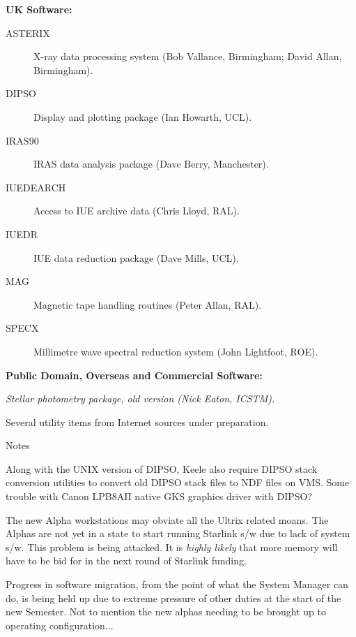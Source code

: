 \begin{center}
{\bf UK Software:}
\end{center}

\begin{description}
\item[ASTERIX] X-ray data processing system (Bob Vallance, Birmingham; 
David Allan, Birmingham).
\item[DIPSO] Display and plotting package (Ian Howarth, UCL).
\item[IRAS90] IRAS data analysis package (Dave Berry, Manchester).
\item[IUEDEARCH] Access to IUE archive data (Chris Lloyd, RAL).
\item[IUEDR] IUE data reduction package (Dave Mills, UCL).
\item[MAG] Magnetic tape handling routines (Peter Allan, RAL).
\item[SPECX] Millimetre wave spectral reduction system (John Lightfoot, ROE).
\end{description}


\newpage
\vspace{5mm}
\begin{center}
{\bf Public Domain, Overseas and Commercial Software:}
\end{center}

\begin{description}
\item[{\em DAOPHOT}] {\em Stellar photometry package, old version (Nick 
Eaton, ICSTM).}
\item  Several utility items from Internet sources under preparation.
\end{description}


\vspace{5mm}
\begin{center}
{\large\sc Notes}
\end{center}

Along with the UNIX version of DIPSO, Keele also require DIPSO stack conversion
utilities to convert old DIPSO stack files to NDF files on VMS.
Some trouble with Canon LPB8AII native GKS graphics driver with DIPSO?

The new Alpha workstations may obviate all the Ultrix related moans. The 
Alphas are not yet in a state to start running Starlink s/w due to lack of 
system s/w. This problem is being attacked.  It is {\em highly likely} that 
more memory will have to be bid for in the next round of Starlink funding.

Progress in software migration, from the point of what the System Manager 
can do, is being held up due to extreme pressure of other duties at the 
start of the new Semester. Not to mention the new alphas needing to be 
brought up to operating configuration...

